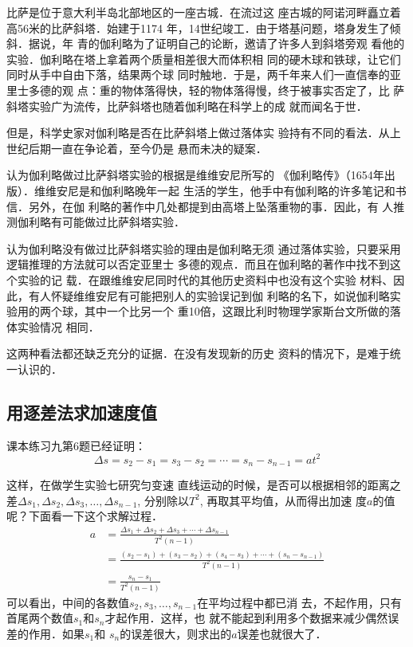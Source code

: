 比萨是位于意大利半岛北部地区的一座古城．在流过这
座古城的阿诺河畔矗立着高56米的比萨斜塔．始建于1174
年，14世纪竣工．由于塔基问题，塔身发生了倾斜．据说，年
青的伽利略为了证明自己的论断，邀请了许多人到斜塔旁观
看他的实验．伽利略在塔上拿着两个质量相差很大而体积相
同的硬木球和铁球，让它们同时从手中自由下落，结果两个球
同时触地．于是，两千年来人们一直信奉的亚里士多德的观
点：重的物体落得快，轻的物体落得慢，终于被事实否定了，比
萨斜塔实验广为流传，比萨斜塔也随着伽利略在科学上的成
就而闻名于世．

但是，科学史家对伽利略是否在比萨斜塔上做过落体实
验持有不同的看法．从上世纪后期一直在争论着，至今仍是
悬而未决的疑案．

认为伽利略做过比萨斜塔实验的根据是维维安尼所写的
《伽利略传》（1654年出版）．维维安尼是和伽利略晚年一起
生活的学生，他手中有伽利略的许多笔记和书信．另外，在伽
利略的著作中几处都提到由高塔上坠落重物的事．因此，有
人推测伽利略有可能做过比萨斜塔实验．

认为伽利略没有做过比萨斜塔实验的理由是伽利略无须
通过落体实验，只要采用逻辑推理的方法就可以否定亚里士
多德的观点．而且在伽利略的著作中找不到这个实验的记
载．在跟维维安尼同时代的其他历史资料中也没有这个实验
材料、因此，有人怀疑维维安尼有可能把别人的实验误记到伽
利略的名下，如说伽利略实验用的两个球，其中一个比另一个
重10倍，这跟比利时物理学家斯台文所做的落体实验情况
相同．

这两种看法都还缺乏充分的证据．在没有发现新的历史
资料的情况下，是难于统一认识的．

\subsection{用逐差法求加速度值}
课本练习九第6题已经证明：$$\Delta s=s_2-s_1=s_3-
s_2=\cdots=s_n-s_{n-1}=at^2$$ 

这样，在做学生实验七研究匀变速
直线运动的时候，是否可以根据相邻的距离之差$\Delta s_1,\Delta s_2,\Delta s_3,\ldots,\Delta s_{n-1}$, 分别除以$T^2$, 再取其平均值，从而得出加速
度$a$的值呢？下面看一下这个求解过程．
\[\begin{split}
    a&=\frac{\Delta s_1+\Delta s_2+\Delta s_3+\cdots+\Delta s_{n-1}}{T^2(n-1)}\\
    &=\frac{(s_2-s_1)+(s_3-s_2)+(s_4-s_3)+\cdots+(s_n-s_{n-1})}{T^2(n-1)}\\
    &=\frac{s_n-s_1}{T^2(n-1)}
\end{split}\]
可以看出，中间的各数值$s_2,s_3,\ldots, s_{n-1}$在平均过程中都已消
去，不起作用，只有首尾两个数值$s_1$和$s_n$才起作用．这样，也
就不能起到利用多个数据来减少偶然误差的作用．如果$s_1$和
$s_n$的误差很大，则求出的$a$误差也就很大了．

